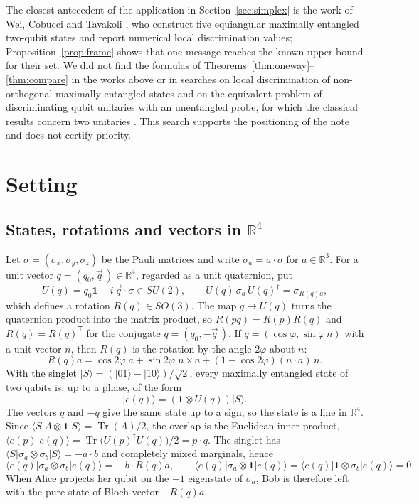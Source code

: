 \documentclass[11pt,a4paper]{article}
\theoremstyle{definition}
\theoremstyle{plain}
\DeclareMathOperator{\Tr}{Tr}
\newcommand{\ket}[1]{\lvert#1\rangle}
\newcommand{\bra}[1]{\langle#1\rvert}
\newcommand{\braket}[2]{\langle#1\vert#2\rangle}
\newcommand{\one}{\mathbf{1}}
\newcommand{\R}{\mathbb{R}}
\newcommand{\T}{\mathsf{T}}
\begin{document}
The closest antecedent of the application in Section~\ref{sec:simplex} is the
work of Wei, Cobucci and Tavakoli \cite{Wei2024}, who construct five
equiangular maximally entangled two-qubit states and report numerical local
discrimination values; Proposition~\ref{prop:frame} shows that one message
reaches the known upper bound for their set. We did not find the formulas of
Theorems~\ref{thm:oneway}--\ref{thm:compare} in the works above or in
searches on local discrimination of non-orthogonal maximally entangled states
and on the equivalent problem of discriminating qubit unitaries with an
unentangled probe, for which the classical results concern two unitaries
\cite{Acin2001,DAriano2001}. This search supports the positioning of the note
and does not certify priority.

\section{Setting}\label{sec:setting}
\subsection{States, rotations and vectors in $\R^4$}
Let $\sigma=(\sigma_x,\sigma_y,\sigma_z)$ be the Pauli matrices and write
$\sigma_a=a\cdot\sigma$ for $a\in\R^3$. For a unit vector
$q=(q_0,\vec q\,)\in\R^4$, regarded as a unit quaternion, put
\[
U(q)=q_0\one-i\,\vec q\cdot\sigma\in SU(2),\qquad
U(q)\,\sigma_a\,U(q)^\dagger=\sigma_{R(q)a},
\]
which defines a rotation $R(q)\in SO(3)$. The map $q\mapsto U(q)$ turns the
quaternion product into the matrix product, so $R(pq)=R(p)R(q)$ and
$R(\bar q)=R(q)^\T$ for the conjugate $\bar q=(q_0,-\vec q\,)$. If
$q=(\cos\varphi,\sin\varphi\,n)$ with a unit vector $n$, then $R(q)$ is the
rotation by the angle $2\varphi$ about $n$:
\begin{equation}\label{eq:rot}
R(q)a=\cos2\varphi\;a+\sin2\varphi\;n\times a+(1-\cos2\varphi)(n\cdot a)\,n .
\end{equation}
With the singlet $\ket S=(\ket{01}-\ket{10})/\sqrt2$, every maximally
entangled state of two qubits is, up to a phase, of the form
\[
\ket{e(q)}=(\one\otimes U(q))\ket S .
\]
The vectors $q$ and $-q$ give the same state up to a sign, so the state is a
line in $\R^4$. Since $\bra S A\otimes\one\ket S=\Tr(A)/2$, the overlap is the
Euclidean inner product, $\braket{e(p)}{e(q)}=\Tr\bigl(U(p)^\dagger
U(q)\bigr)/2=p\cdot q$. The singlet has
$\bra S\sigma_a\otimes\sigma_b\ket S=-a\cdot b$ and completely mixed
marginals, hence
\begin{equation}\label{eq:corr}
\bra{e(q)}\sigma_a\otimes\sigma_b\ket{e(q)}=-\,b\cdot R(q)a,\qquad
\bra{e(q)}\sigma_a\otimes\one\ket{e(q)}=\bra{e(q)}\one\otimes\sigma_b\ket{e(q)}=0 .
\end{equation}
When Alice projects her qubit on the $+1$ eigenstate of $\sigma_a$, Bob is
therefore left with the pure state of Bloch vector $-R(q)a$.
\end{document}
